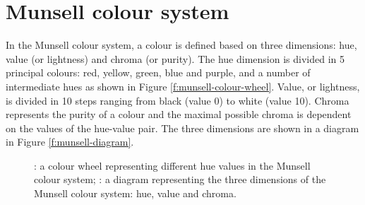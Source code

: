 \section{Munsell colour system}
\label{s:munsell}

In the Munsell colour system, a colour is defined based on three
dimensions: hue, value (or lightness) and chroma (or purity). The hue
dimension is divided in 5 principal colours: red, yellow, green, blue
and purple, and a number of intermediate hues as shown in Figure
\ref{f:munsell-colour-wheel}. Value, or lightness, is divided in 10
steps ranging from black (value 0) to white (value 10). Chroma
represents the purity of a colour and the maximal possible chroma is
dependent on the values of the hue-value pair. The three dimensions
are shown in a diagram in Figure \ref{f:munsell-diagram}.

\begin{figure}[htbp]
\centering
{}
\caption[The Munsell colour system]{: a colour wheel representing different hue values in the Munsell colour system; : a diagram representing the three dimensions of the Munsell colour system: hue, value and chroma.}
\end{figure}

